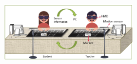 \documentclass[manuscript,screen]{acmart}
\begin{document}
\begin{figure}
    \centering
    \includegraphics[width=7cm]{figures/caigroup.png}
    \caption{\cite{cai2019designb} }
    \label{fig:caigroup}
\end{figure}




\end{document}
